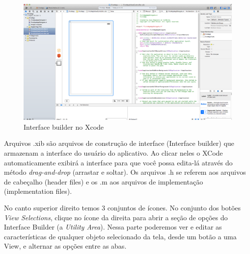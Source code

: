 \documentclass[a4paper,12pt,brazil,doubleside]{book}
\begin{document}
\begin{singlespace}
\begin{figure}[H]
  \centering
  \includegraphics[width=.99\textwidth]{figuras/3/tela_novo_projeto_10.png}
  \caption{Interface builder no Xcode}
  \label{fig:a}
\end{figure}


Arquivos .xib são arquivos de construção de interface (Interface builder) que armazenam a interface do usuário do aplicativo. Ao clicar neles o XCode automaticamente exibirá a interface para que você possa edita-lá através do método \emph{drag-and-drop} (arrastar e soltar).
Os arquivos .h se referem aos arquivos de cabeçalho (header files) e os .m aos arquivos de implementação (implementation files).


No canto superior direito temos 3 conjuntos de ícones. No conjunto dos botões \emph{View Selections}, clique no ícone da direita para abrir a seção de opções do Interface Builder (a \emph{Utility Area}). Nessa parte poderemos ver e editar as características de qualquer objeto selecionado da tela, desde um botão a uma View, e alternar as opções entre as abas.


\end{singlespace}
\end{document}
